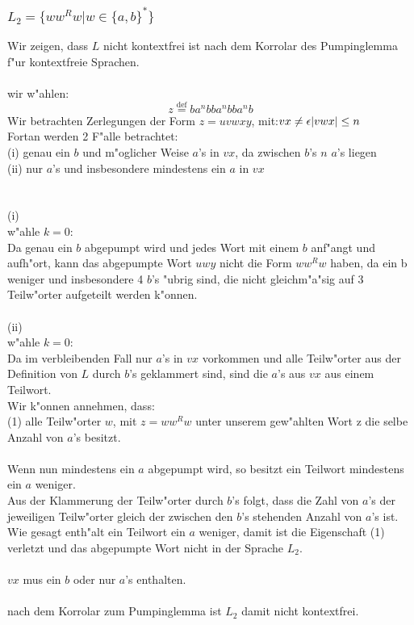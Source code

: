 \documentclass{article}
\newcommand{\gap}{\null\ \\ \\}
\newcommand{\eps}{\epsilon}
\newcommand{\mdef}{\overset{\text{def}}{=}}
\begin{document}
\subsubsection{$L_2 = \{ww^Rw | w \in \{a,b\}^*\}$}
Wir zeigen, dass $L$ nicht kontextfrei ist nach dem Korrolar des Pumpinglemma
    f"ur kontextfreie Sprachen.\\
\\
wir w"ahlen:\[
    z \mdef ba^nbba^nbba^nb
\]
Wir betrachten Zerlegungen der Form $z = uvwxy$, mit:$\\
    vx \neq \eps\\
    |vwx| \leq n\\
$\\
Fortan werden 2 F"alle betrachtet:\\
(i) genau ein $b$ und m"oglicher Weise $a$'s in $vx$, da zwischen $b$'s $n$ $a$'s 
    liegen\\
(ii) nur $a$'s und insbesondere mindestens ein $a$ in $vx$\\
\gap
(i)\\
w"ahle $k=0$:\\
Da genau ein $b$ abgepumpt wird und jedes Wort mit einem $b$ anf"angt und 
    aufh"ort, kann das abgepumpte Wort $uwy$ nicht die Form $ww^Rw$ haben, da
    ein b weniger und insbesondere 4 $b$'s "ubrig sind, die nicht gleichm"a"sig
    auf 3 Teilw"orter aufgeteilt werden k"onnen.\\
\\
(ii)\\
w"ahle $k=0$:\\
Da im verbleibenden Fall nur $a$'s in $vx$ vorkommen und alle Teilw"orter aus 
    der Definition von $L$ durch 
    $b$'s geklammert sind, sind die $a$'s aus $vx$ aus einem Teilwort.\\
Wir k"onnen annehmen, dass:\\
    (1) alle Teilw"orter $w$, mit $z=ww^Rw$ unter unserem gew"ahlten Wort z 
    die selbe Anzahl von $a$'s besitzt.\\
\\
Wenn nun mindestens ein $a$ abgepumpt wird, so besitzt ein Teilwort mindestens
    ein $a$ weniger.\\
Aus der Klammerung der Teilw"orter durch $b$'s folgt, dass die Zahl von $a$'s
    der jeweiligen Teilw"orter gleich der zwischen den $b$'s stehenden 
    Anzahl von $a$'s ist.\\
Wie gesagt enth"alt ein Teilwort ein $a$ weniger, damit ist die Eigenschaft (1)
    verletzt und das abgepumpte Wort nicht in der Sprache $L_2$.\\
\\
$vx$ mus ein $b$ oder nur $a$'s enthalten.\\
\\
nach dem Korrolar zum Pumpinglemma ist $L_2$ damit nicht kontextfrei.\\
    
\end{document}
